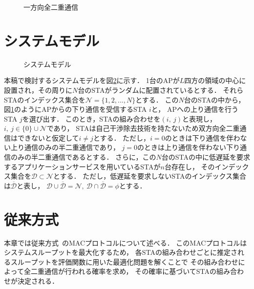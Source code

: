 \documentclass[technicalreport]{ieicej}
\newcommand{\sij}{(i,\ j)}
\newcommand{\mN}{{\mathcal N}}
\begin{document}
	\begin{figure}[t]
		\centering
		\caption{一方向全二重通信}
		\label{fig:topology}
	\end{figure}

\section{システムモデル}
	\begin{figure}[t]
		\centering
		\caption{システムモデル}
		\label{fig:model}
	\end{figure}

	本稿で検討するシステムモデルを図\ref{fig:model}に示す．
	1台のAPが$L$四方の領域の中心に設置され，その周りに$N$台のSTAがランダムに配置されているとする．
	それらSTAのインデックス集合を$\mN=\{1,2,...,N\}$とする．
	この$N$台のSTAの中から，図\ref{fig:topology}のようにAPからの下り通信を受信するSTA $i$と，
	APへの上り通信を行うSTA $j$を選び出す．
	このとき，STAの組み合わせを$\sij$と表現し，$i,\ j \in \{0\}\cup \mN$であり，
	STAは自己干渉除去技術を持たないため双方向全二重通信はできないと仮定して$i\neq j$とする．
	ただし，$i=0$のときは下り通信を伴わない上り通信のみの半二重通信であり，
	$j=0$のときは上り通信を伴わない下り通信のみの半二重通信であるとする．
	さらに，この$N$台のSTAの中に低遅延を要求するアプリケーションサービスを用いているSTAが$n$台存在し，
	そのインデックス集合を${\mathcal D}\subset\mN$とする．
	ただし，低遅延を要求しないSTAのインデックス集合は${\overline {\mathcal D}}$と表し，
	${\mathcal D} \cup {\overline {\mathcal D}}=\mN,\ {\mathcal D} \cap {\overline {\mathcal D}}=\phi$とする．

\section{従来方式}
	本章では従来方式~\cite{promac}のMACプロトコルについて述べる．
	このMACプロトコルはシステムスループットを最大化するため，
	各STAの組み合わせごとに推定されるスループットを評価関数に用いた最適化問題を解くことで
	その組み合わせによって全二重通信が行われる確率を求め，
	その確率に基づいてSTAの組み合わせが決定される．
\end{document}

